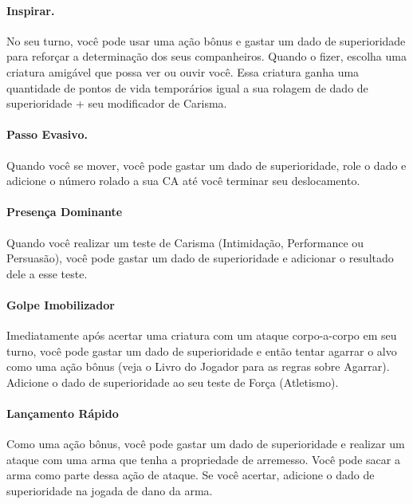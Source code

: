 \documentclass{RPG_Adventure}[2021/10/20]
\begin{document}
\begin{multicols}{2}
\paragraph{Inspirar.} No seu turno, você pode usar uma ação bônus e gastar um
dado de superioridade para reforçar a determinação dos seus companheiros. Quando
o fizer, escolha uma criatura amigável que possa ver ou ouvir você. Essa
criatura ganha uma quantidade de pontos de vida temporários igual a sua rolagem
de dado de superioridade + seu modificador de Carisma.

\paragraph{Passo Evasivo.} Quando você se mover, você pode gastar um dado de
superioridade, role o dado e adicione o número rolado a sua CA até você terminar
seu deslocamento.

\paragraph{Presença Dominante} Quando você realizar um teste de Carisma
(Intimidação, Performance ou Persuasão), você pode gastar um dado de
superioridade e adicionar o resultado dele a esse teste.

\paragraph{Golpe Imobilizador} Imediatamente após acertar uma criatura com um
ataque corpo-a-corpo em seu turno, você pode gastar um dado de superioridade e
então tentar agarrar o alvo como uma ação bônus (veja o Livro do Jogador para as
regras sobre Agarrar). Adicione o dado de superioridade ao seu teste de Força
(Atletismo).

\paragraph{Lançamento Rápido} Como uma ação bônus, você pode gastar um dado de
superioridade e realizar um ataque com uma arma que tenha a propriedade de
arremesso. Você pode sacar a arma como parte dessa ação de ataque. Se você
acertar, adicione o dado de superioridade na jogada de dano da arma.
\end{multicols}

\end{document}
